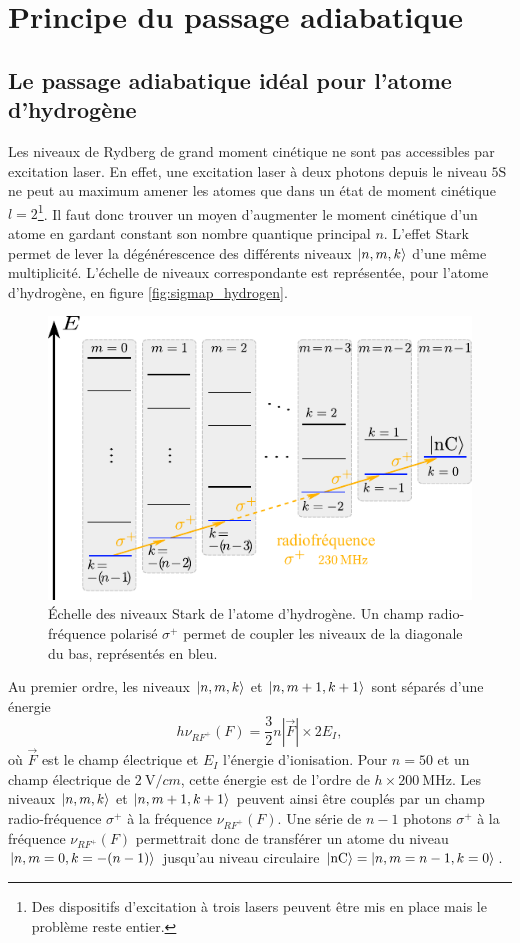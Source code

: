 \section{Principe du passage adiabatique}
 \subsection{Le passage adiabatique idéal pour l'atome d'hydrogène}
\noindent Les niveaux de Rydberg de grand moment cinétique ne sont pas accessibles par excitation laser.
En effet, une excitation laser à deux photons depuis le niveau $\mathrm{5S}$ ne peut au maximum amener les atomes que dans un état de moment cinétique $l=2$\footnote{
Des dispositifs d'excitation à trois lasers peuvent être mis en place mais le problème reste entier.
}.
Il faut donc trouver un moyen d'augmenter le moment cinétique d'un atome en gardant constant son nombre quantique principal $n$.
L'effet Stark permet de lever la dégénérescence des différents niveaux $\ket{n,m,k}$ d'une même multiplicité.
L'échelle de niveaux correspondante est représentée, pour l'atome d'hydrogène, en figure \eqref{fig:sigmap_hydrogen}.
%
\begin{figure}[t]
\centering
\includegraphics[width=.6\linewidth]{figures/circulars/sigmap_hydrogen}
\caption[Échelle des niveaux Stark de l'atome d'hydrogène]{
Échelle des niveaux Stark de l'atome d'hydrogène.
Un champ radio-fréquence polarisé $\sigma^+$ permet de coupler les niveaux de la diagonale du bas, représentés en bleu.
}
\label{fig:sigmap_hydrogen}
\end{figure} 
%
Au premier ordre, les niveaux $\ket{n,m,k}$ et $\ket{n,m+1,k+1}$ sont séparés d'une énergie
\begin{equation}
h\nu_{RF^+}(F) = \frac{3}{2}n|\vec{F}|\times 2E_I,
\end{equation}
où $\vec{F}$ est le champ électrique et $E_I$ l'énergie d'ionisation.
Pour $n=50$ et un champ électrique de $\SI{2}{\V/cm}$, cette énergie est de l'ordre de $h\times\SI{200}{\MHz}$.
Les niveaux $\ket{n,m,k}$ et $\ket{n,m+1,k+1}$ peuvent ainsi être couplés par un champ radio-fréquence $\sigma^+$ à la fréquence $\nu_{RF^+}(F)$.
Une série de $n-1$ photons $\sigma^+$ à la fréquence $\nu_{RF^+}(F)$ permettrait donc de transférer un atome du niveau $\ket{n,m=0,k=-(n-1)}$ jusqu'au niveau circulaire $\ket{\mathrm{nC}}=\ket{n,m=n-1,k=0}$.

